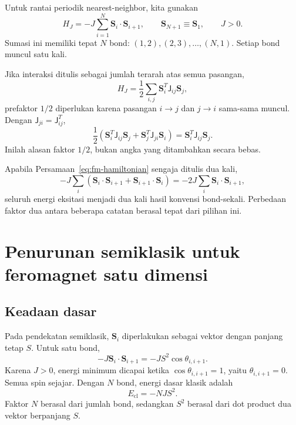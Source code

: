 \documentclass[11pt,a4paper]{article}
\newcommand{\vS}{\bm S}
\newcommand{\mJ}{\mathsf J}
\begin{document}
Untuk rantai periodik nearest-neighbor, kita gunakan
\begin{equation}
H_J=-J\sum_{i=1}^{N}\vS_i\cdot\vS_{i+1},
\qquad \vS_{N+1}\equiv\vS_1,
\qquad J>0.
\label{eq:fm-hamiltonian}
\end{equation}
Sumasi ini memiliki tepat $N$ bond: $(1,2),(2,3),\ldots,(N,1)$. Setiap bond muncul satu kali.

Jika interaksi ditulis sebagai jumlah terarah atas semua pasangan,
\begin{equation}
H_J=\frac12\sum_{i,j}\vS_i^{T}\mJ_{ij}\vS_j,
\label{eq:directed-sum}
\end{equation}
prefaktor $1/2$ diperlukan karena pasangan $i\to j$ dan $j\to i$ sama-sama muncul. Dengan $\mJ_{ji}=\mJ_{ij}^{T}$,
\begin{equation}
\frac12\left(\vS_i^T\mJ_{ij}\vS_j+\vS_j^T\mJ_{ji}\vS_i\right)
=\vS_i^T\mJ_{ij}\vS_j.
\end{equation}
Inilah alasan faktor $1/2$, bukan angka yang ditambahkan secara bebas.

Apabila Persamaan~\eqref{eq:fm-hamiltonian} sengaja ditulis dua kali,
\begin{equation}
-J\sum_i\left(\vS_i\cdot\vS_{i+1}+\vS_{i+1}\cdot\vS_i\right)
=-2J\sum_i\vS_i\cdot\vS_{i+1},
\end{equation}
seluruh energi eksitasi menjadi dua kali hasil konvensi bond-sekali. Perbedaan faktor dua antara beberapa catatan berasal tepat dari pilihan ini.

\section{Penurunan semiklasik untuk feromagnet satu dimensi}

\subsection{Keadaan dasar}

Pada pendekatan semiklasik, $\vS_i$ diperlakukan sebagai vektor dengan panjang tetap $S$. Untuk satu bond,
\begin{equation}
-J\vS_i\cdot\vS_{i+1}
=-JS^2\cos\theta_{i,i+1}.
\end{equation}
Karena $J>0$, energi minimum dicapai ketika $\cos\theta_{i,i+1}=1$, yaitu $\theta_{i,i+1}=0$. Semua spin sejajar. Dengan $N$ bond, energi dasar klasik adalah
\begin{equation}
E_{\mathrm{cl}}=-NJS^2.
\label{eq:fm-classical-energy}
\end{equation}
Faktor $N$ berasal dari jumlah bond, sedangkan $S^2$ berasal dari dot product dua vektor berpanjang $S$.
\end{document}
